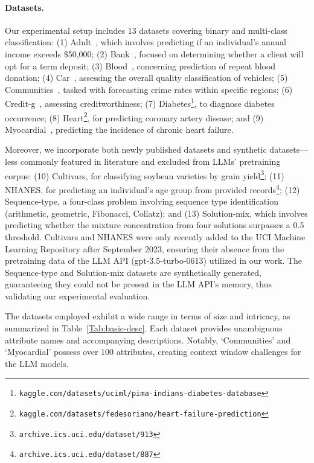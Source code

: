 \paragraph{Datasets.}
Our experimental setup includes 13 datasets covering binary and multi-class classification: (1) Adult~\cite{asuncion2007uci}, which involves predicting if an individual’s annual income exceeds \$50,000; (2) Bank~\cite{moro2014data}, focused on determining whether a client will opt for a term deposit; (3) Blood~\cite{yeh2009knowledge}, concerning prediction of repeat blood donation; (4) Car~\cite{kadra2021well}, assessing the overall quality classification of vehicles; (5) Communities~\cite{misc_communities_and_crime_183}, tasked with forecasting crime rates within specific regions; (6) Credit-g~\cite{kadra2021well}, assessing creditworthiness; (7) Diabetes\footnote{\texttt{kaggle.com/datasets/uciml/pima-indians-diabetes-database}}, to diagnose diabetes occurrence; (8) Heart\footnote{\texttt{kaggle.com/datasets/fedesoriano/heart-failure-prediction}}, for predicting coronary artery disease; and (9) Myocardial~\cite{misc_myocardial_infarction_complications_579}, predicting the incidence of chronic heart failure.

Moreover, we incorporate both newly published datasets and synthetic datasets—less commonly featured in literature and excluded from LLMs’ pretraining corpus: (10) Cultivars, for classifying soybean varieties by grain yield\footnote{\texttt{archive.ics.uci.edu/dataset/913}}; (11) NHANES, for predicting an individual’s age group from provided records\footnote{\texttt{archive.ics.uci.edu/dataset/887}}; (12) Sequence-type, a four-class problem involving sequence type identification (arithmetic, geometric, Fibonacci, Collatz); and (13) Solution-mix, which involves predicting whether the mixture concentration from four solutions surpasses a 0.5 threshold. Cultivars and NHANES were only recently added to the UCI Machine Learning Repository after September 2023, ensuring their absence from the pretraining data of the LLM API (gpt-3.5-turbo-0613) utilized in our work. The Sequence-type and Solution-mix datasets are synthetically generated, guaranteeing they could not be present in the LLM API’s memory, thus validating our experimental evaluation.

The datasets employed exhibit a wide range in terms of size and intricacy, as summarized in Table~\ref{Tab:basic-desc}. Each dataset provides unambiguous attribute names and accompanying descriptions. Notably, ‘Communities’ and ‘Myocardial’ possess over 100 attributes, creating context window challenges for the LLM models.

